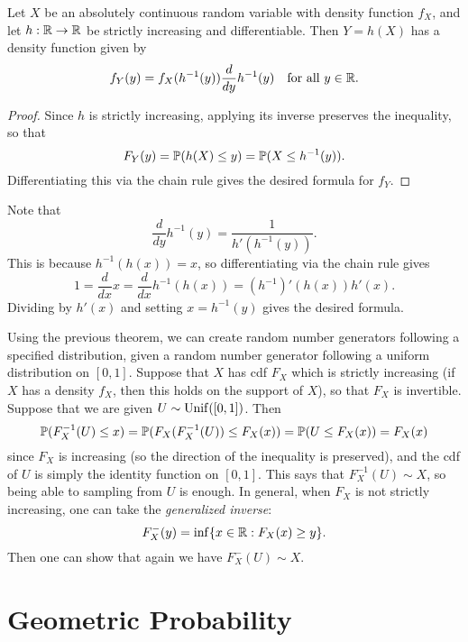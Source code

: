 \begin{theorem}
  Let $X$ be an absolutely continuous random
  variable with density function $f_X$, and let
  $h : \mathbb{R} \to \mathbb{R}$ be strictly increasing
  and differentiable. Then $Y = h(X)$ has
  a density function given by
  \[
    f_Y(y) = f_X(h^{-1}(y)) \frac{d}{dy} h^{-1}(y)
    \quad \text{for all $y \in \mathbb{R}$}.
  \]
\end{theorem}

\begin{proof}
  Since $h$ is strictly increasing, applying its
  inverse preserves the inequality, so that
  \[
    F_Y(y) = \mathbb{P}(h(X) \le y)
    = \mathbb{P}(X \le h^{-1}(y)).
  \]
  Differentiating this via the chain rule gives
  the desired formula for $f_Y$.
\end{proof}

\begin{remark}
  Note that
  \[
    \frac{d}{dy} h^{-1}(y)
    = \frac{1}{h'(h^{-1}(y))}.
  \]
  This is because $h^{-1}(h(x)) = x$, so differentiating
  via the chain rule gives
  \[
    1 = \frac{d}{dx} x = \frac{d}{dx} h^{-1}(h(x))
    = (h^{-1})'(h(x)) h'(x).
  \]
  Dividing by $h'(x)$ and setting $x = h^{-1}(y)$ gives
  the desired formula.
\end{remark}

\begin{remark}
  Using the previous theorem, we can create
  random number generators following a specified
  distribution, given a random number generator
  following a uniform distribution on
  $[0, 1]$.
  Suppose that $X$ has cdf $F_X$ which
  is strictly increasing (if $X$ has a density
  $f_X$, then this holds on the support of $X$), so
  that $F_X$ is invertible. Suppose that
  we are given $U \sim \operatorname{Unif}([0, 1])$.
  Then
  \[
    \mathbb{P}(F_X^{-1}(U) \le x)
    = \mathbb{P}(F_X(F_X^{-1}(U)) \le F_X(x))
    = \mathbb{P}(U \le F_X(x)) = F_X(x)
  \]
  since $F_X$ is increasing (so the direction of
  the inequality is preserved), and the cdf of
  $U$ is simply the identity function on $[0, 1]$.
  This says that $F_X^{-1}(U) \sim X$, so being
  able to sampling
  from $U$ is enough. In general, when
  $F_X$ is not strictly increasing,
  one can take the \emph{generalized inverse}:
  \[
    F_X^-(y) = \inf\{x \in \mathbb{R} : F_X(x) \ge y\}.
  \]
  Then one can show that again we have
  $F_X^-(U) \sim X$.
\end{remark}

\section{Geometric Probability}


